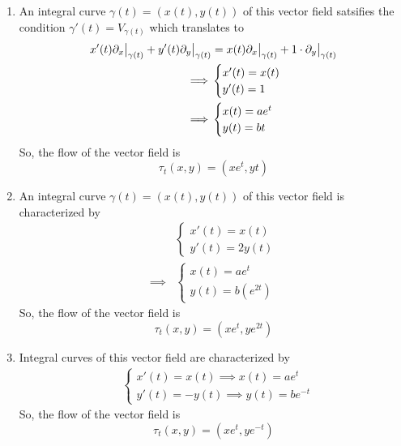\documentclass{article}
\newcommand{\restr}[2]{{%
  \left.\kern-\nulldelimiterspace %
  #1 %
  \vphantom{\big|} %
  \right|_{#2} %
  }}
\begin{document}
\begin{enumerate}[label=(\alph*)]
  \item An integral curve $\gamma(t) = \left( x(t), y(t) \right)$ of this vector field satsifies the condition $\gamma'(t) = V_{\gamma(t)}$ which translates to 
  \begin{align*}
    x'(t) \restr{\partial_x}{\gamma(t)} + y'(t) \restr{\partial_y}{\gamma(t)} &= x(t) \restr{\partial_x}{\gamma(t)} + 1 \cdot \restr{\partial_y}{\gamma(t)} \\
    \implies& \begin{cases}
      x'(t) = x(t) \\
      y'(t) = 1
    \end{cases} \\
    \implies &\begin{cases}
      x(t) = ae^t \\
      y(t) = bt
    \end{cases}
  \end{align*}
  So, the flow of the vector field is \[ \boxed{\tau_t(x, y) = \left(xe^{t}, yt\right) }\]

  \vskip 0.5cm
  \item An integral curve $\gamma(t) = \left(x(t), y(t)\right)$ of this vector field is characterized by 
  \begin{align*}
    &\begin{cases}
      x'(t) = x(t) \\
      y'(t) = 2y(t)
    \end{cases} \\
    \implies &\begin{cases}
      x(t) = ae^t \\
      y(t) = b\left(e^{2t}\right)
    \end{cases}
  \end{align*} 
  So, the flow of the vector field is \[ \boxed{\tau_t(x, y) = \left( xe^t, ye^{2t} \right)}  \]
  
  \vskip 0.5cm
  \item Integral curves of this vector field are characterized by 
  \begin{align*}
    &\begin{cases}
      x'(t) = x(t) \implies x(t) = ae^{t} \\
      y'(t) = -y(t) \implies y(t) = be^{-t}
    \end{cases}
  \end{align*}
  So, the flow of the vector field is \[ \boxed{ \tau_t(x, y) = \left( xe^{t}, ye^{-t} \right)}  \]


\end{enumerate}
\end{document}
